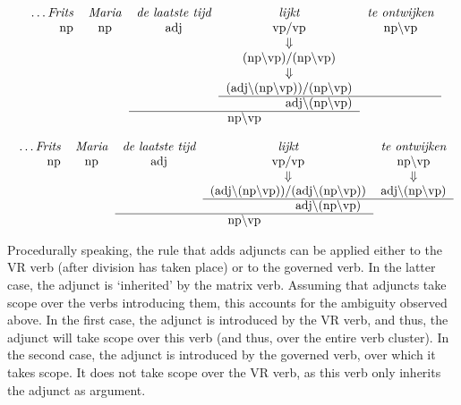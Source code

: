 {\sc 
\begin{equation}
\label{wide}
\mbox{
\begin{tabular}[t]{rcccccc}
\ldots {\em Frits} & {\em Maria} & {\em de laatste tijd} & {\em lijkt}
                                                        & {\em te ontwijken}\\
        np      & np            & adj                   & vp/vp  &  
np$\backslash$vp\\
                                                &&&$\Downarrow$ \\
                                       &&& 
(np$\backslash$vp)$/$(np$\backslash$vp)\\
                                      &&&$\Downarrow$ \\
                       &&& 
(adj$\backslash$(np$\backslash$vp))$/$(np$\backslash$vp) \\
\cline{4-5}     &&& \multicolumn{1}{r}{adj$\backslash$(np$\backslash$vp)} \\
\cline{3-4} && \multicolumn{2}{c}{np$\backslash$vp}
\end{tabular}
}
\end{equation}

\begin{equation}
\label{narrow}
\mbox{
\begin{tabular}[t]{rcccccc}
\ldots {\em Frits} & {\em Maria} & {\em de laatste tijd} & {\em lijkt}
                                                        & {\em te ontwijken}\\
        np      & np            & adj                   & vp$/$vp  &  
np$\backslash$vp\\
                                        &&&$\Downarrow$ & $\Downarrow$\\
        &&& 
(adj$\backslash$(np$\backslash$vp))/(adj$\backslash$(np$\backslash$vp))
                         & adj$\backslash$(np$\backslash$vp)\\
\cline{4-5}     &&& \multicolumn{2}{c}{adj$\backslash$(np$\backslash$vp)} \\
\cline{3-4} && \multicolumn{2}{c}{np$\backslash$vp}
\end{tabular}
}
\end{equation}
}

\noindent Procedurally speaking, the rule that adds adjuncts can be applied
either to the VR verb (after division has taken place) or to the governed verb.
In the latter case, the adjunct is `inherited' by the matrix verb.  Assuming
that adjuncts take scope over the verbs introducing them, this accounts for the
ambiguity observed above.  In the first case, the adjunct is introduced by the
VR verb, and thus, the adjunct will take scope over this verb (and thus, over
the entire verb cluster).  In the second case, the adjunct is introduced by the
governed verb, over which it takes scope.  It does not take scope over the VR
verb, as this verb only inherits the adjunct as argument.

